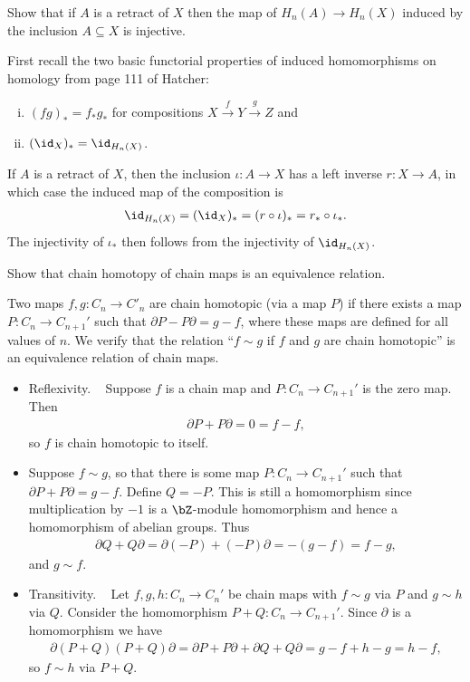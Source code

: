 \begin{homework}[e]
\begin{prf}
  \end{prf}
  \prob[2.1.11] Show that if $A$ is a retract of $X$ then the map of $H_n(A)\to H_n(X)$ induced by the inclusion $A\subseteq X$ is injective.
  \begin{prf}
    First recall the two basic functorial properties of induced homomorphisms on homology from page 111 of Hatcher:
    \begin{enumerate}[(i)]
      \item $(fg)_* = f_*g_*$ for compositions $X\xrightarrow{f}Y\xrightarrow{g}Z$ and
      \item $(\id_X)_* = \id_{H_n(X)}$.
    \end{enumerate}
    If $A$ is a retract of $X$, then the inclusion $\iota:A\to X$ has a left inverse $r:X\to A$, in which case the induced map of the composition is
    \begin{align*}
      \id_{H_n(X)} = (\id_X)_* = (r\circ \iota)_* = r_*\circ \iota_*.
    \end{align*}
    The injectivity of $\iota_*$ then follows from the injectivity of $\id_{H_n(X)}$.
  \end{prf}
  \prob[2.1.12] Show that chain homotopy of chain maps is an equivalence relation.
  \begin{prf}
    Two maps $f,g:C_n \to C'_n$ are chain homotopic (via a map $P$) if there exists a map $P:C_n \to C_{n+1}'$ such that $\partial P - P\partial = g - f$, where these maps are defined for all values of $n$. We verify that the relation ``$f \sim g$ if $f$ and $g$ are chain homotopic'' is an equivalence relation of chain maps.
    \begin{itemize}
      \item Reflexivity. ~ Suppose $f$ is a chain map and $P:C_n\to C_{n+1}'$ is the zero map. Then
        \begin{align*}
          \partial P + P \partial = 0 = f - f,
        \end{align*}
        so $f$ is chain homotopic to itself.
      \item Suppose $f \sim g$, so that there is some map $P:C_n \to C_{n+1}'$ such that $\partial P + P \partial = g - f$. Define $Q = -P$. This is still a homomorphism since multiplication by $-1$ is a $\bZ$-module homomorphism and hence a homomorphism of abelian groups. Thus
        \begin{align*}
          \partial Q + Q\partial = \partial (-P) + (-P)\partial = - (g - f) = f - g,
        \end{align*}
        and $g \sim f$.
      \item Transitivity. ~ Let $f,g,h:C_n \to C_n'$ be chain maps with $f \sim g$ via $P$ and $g \sim h$ via $Q$. Consider the homomorphism $P + Q:C_n \to C_{n+1}'$. Since $\partial$ is a homomorphism we have
        \begin{align*}
          \partial(P+Q) (P+Q)\partial = \partial P + P\partial + \partial Q  + Q\partial = g - f + h - g = h - f,
        \end{align*}
        so $f \sim h$ via $P + Q$.
    \end{itemize}


\end{prf}
\end{homework}
